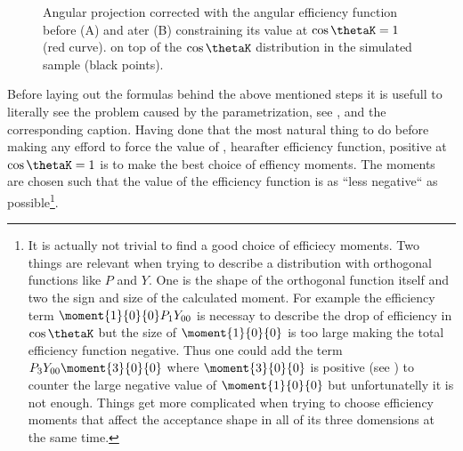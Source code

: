 \begin{figure}[h]
  \centering
  \begin{subfigure}{0.5\textwidth}
    \scalebox{1.3}{}
    \caption{}
  \end{subfigure}%
  \hfill%
  \begin{subfigure}{0.5\textwidth}
    \scalebox{1.3}{}
    \caption{}
  \end{subfigure}
  \caption{Angular \pdf projection corrected with the angular efficiency function before (A) and ater (B) constraining its value at $\cos\thetaK=1$ (red curve). 
           on top of the $\cos\thetaK$ distribution in the simulated sample (black points).
            }
  \label{angAcc_constr}
\end{figure}

Before laying out the formulas behind the above mentioned steps it is usefull to literally see the problem caused by the parametrization, see , 
and the corresponding caption. Having done that the most natural thing to do before making any efford to force the value of , hearafter efficiency function,
positive at $\cos\thetaK=1$ is to make the best choice of effiency moments. The moments are chosen such that the value of the efficiency function is as ``less negative``
as 
possible\footnote{It is actually not trivial to find a good choice of efficiecy moments. Two things are relevant when trying to describe a 
distribution with orthogonal functions like $P$ and $Y$. One is the shape of the orthogonal function itself and two the sign and size of the calculated moment.
For example the efficiency term $\moment{1}{0}{0}P_1Y_{00}$ is necessay to describe the drop of efficiency in $\cos\thetaK$ but the size of $\moment{1}{0}{0}$ 
is too large making the total efficiency function negative. Thus one could add the term $P_3Y_{00}\moment{3}{0}{0}$ where $\moment{3}{0}{0}$ is positive
(see  ) to counter the large negative value of $\moment{1}{0}{0}$ but unfortunatelly it is not enough. Things get more complicated
when trying to choose efficiency moments that affect the acceptance shape in all of its three domensions at the same time.
}.

